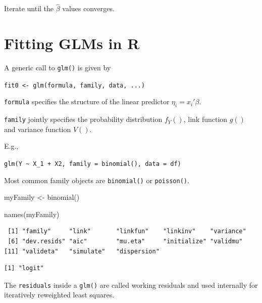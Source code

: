 \documentclass[
  letterpaper,
  DIV=11,
  numbers=noendperiod]{scrreport}
\newenvironment{Shaded}{\begin{snugshade}}{\end{snugshade}}
\newcommand{\FunctionTok}[1]{\textcolor[rgb]{0.28,0.35,0.67}{#1}}
\newcommand{\NormalTok}[1]{\textcolor[rgb]{0.00,0.23,0.31}{#1}}
\newcommand{\OtherTok}[1]{\textcolor[rgb]{0.00,0.23,0.31}{#1}}
\newcommand{\SpecialCharTok}[1]{\textcolor[rgb]{0.37,0.37,0.37}{#1}}
\begin{document}
Iterate until the \(\hat \beta\) values converges.


\hypertarget{fitting-glms-in-r}{%
\chapter{Fitting GLMs in R}\label{fitting-glms-in-r}}

A generic call to \texttt{glm()} is given by

\texttt{fit0\ \textless{}-\ glm(formula,\ family,\ data,\ ...)}

\texttt{formula} specifies the structure of the linear predictor
\(\eta_i = x_i' \beta\).

\texttt{family} jointly specifies the probability distribution
\(f_Y()\), link function \(g()\) and variance function \(V()\).

E.g.,

\texttt{glm(Y\ \textasciitilde{}\ X\_1\ +\ X2,\ family\ =\ binomial(),\ data\ =\ df)}

Most common family objects are \texttt{binomial()} or
\texttt{poisson()}.

\begin{Shaded}
\begin{Highlighting}[]
\NormalTok{myFamily }\OtherTok{\textless{}{-}} \FunctionTok{binomial}\NormalTok{()}

\FunctionTok{names}\NormalTok{(myFamily)}
\end{Highlighting}
\end{Shaded}

\begin{verbatim}
 [1] "family"     "link"       "linkfun"    "linkinv"    "variance"  
 [6] "dev.resids" "aic"        "mu.eta"     "initialize" "validmu"   
[11] "valideta"   "simulate"   "dispersion"
\end{verbatim}

\begin{Shaded}
\end{Shaded}

\begin{verbatim}
[1] "logit"
\end{verbatim}

The \texttt{residuals} inside a \texttt{glm()} are called working
residuals and used internally for iteratively reweighted least squares.
\end{document}

